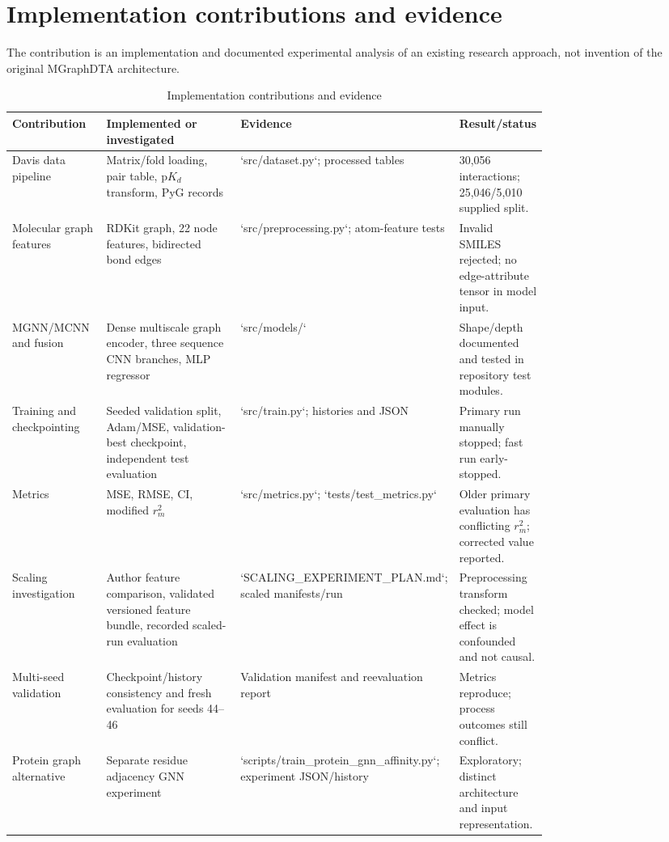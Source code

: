 \section{Implementation contributions and evidence}
The contribution is an implementation and documented experimental analysis of an existing research approach, not invention of the original MGraphDTA architecture.

\begin{table}[tb]\centering\scriptsize
\caption{Implementation contributions and evidence}
\label{tab:contrib}
\begin{tabularx}{\linewidth}{p{0.20\linewidth}p{0.37\linewidth}p{0.20\linewidth}X}
\toprule Contribution & Implemented or investigated & Evidence & Result/status \\
\midrule
Davis data pipeline & Matrix/fold loading, pair table, p$K_d$ transform, PyG records & `src/dataset.py`; processed tables & 30,056 interactions; 25,046/5,010 supplied split. \\
Molecular graph features & RDKit graph, 22 node features, bidirected bond edges & `src/preprocessing.py`; atom-feature tests & Invalid SMILES rejected; no edge-attribute tensor in model input. \\
MGNN/MCNN and fusion & Dense multiscale graph encoder, three sequence CNN branches, MLP regressor & `src/models/` & Shape/depth documented and tested in repository test modules. \\
Training and checkpointing & Seeded validation split, Adam/MSE, validation-best checkpoint, independent test evaluation & `src/train.py`; histories and JSON & Primary run manually stopped; fast run early-stopped. \\
Metrics & MSE, RMSE, CI, modified $r_m^2$ & `src/metrics.py`; `tests/test_metrics.py` & Older primary evaluation has conflicting $r_m^2$; corrected value reported. \\
Scaling investigation & Author feature comparison, validated versioned feature bundle, recorded scaled-run evaluation & `SCALING_EXPERIMENT_PLAN.md`; scaled manifests/run & Preprocessing transform checked; model effect is confounded and not causal. \\
Multi-seed validation & Checkpoint/history consistency and fresh evaluation for seeds 44--46 & Validation manifest and reevaluation report & Metrics reproduce; process outcomes still conflict. \\
Protein graph alternative & Separate residue adjacency GNN experiment & `scripts/train_protein_gnn_affinity.py`; experiment JSON/history & Exploratory; distinct architecture and input representation. \\

\end{tabularx}
\end{table}
